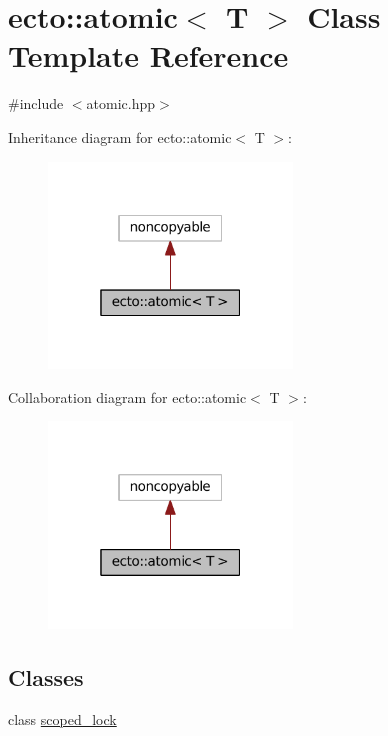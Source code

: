 \hypertarget{classecto_1_1atomic}{}\section{ecto\+:\+:atomic$<$ T $>$ Class Template Reference}
\label{classecto_1_1atomic}


{\ttfamily \#include $<$atomic.\+hpp$>$}



Inheritance diagram for ecto\+:\+:atomic$<$ T $>$\+:\nopagebreak
\begin{figure}[H]
\begin{center}
\leavevmode
\includegraphics[width=184pt]{classecto_1_1atomic__inherit__graph}
\end{center}
\end{figure}


Collaboration diagram for ecto\+:\+:atomic$<$ T $>$\+:\nopagebreak
\begin{figure}[H]
\begin{center}
\leavevmode
\includegraphics[width=184pt]{classecto_1_1atomic__coll__graph}
\end{center}
\end{figure}
\subsection*{Classes}
\begin{DoxyCompactItemize}
\item 
class \hyperlink{classecto_1_1atomic_1_1scoped__lock}{scoped\+\_\+lock}
\end{DoxyCompactItemize}
